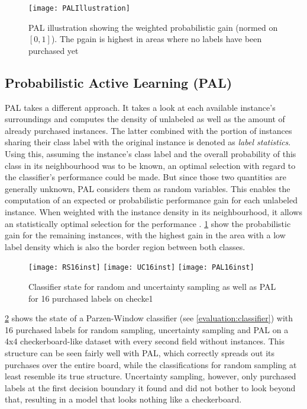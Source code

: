 \begin{figure}[h]
	\centering
	\texttt{[image: PALIllustration]}
	\caption{PAL illustration showing the weighted probabilistic gain (normed on $[0, 1]$). The pgain is highest in areas where no labels have been purchased yet}
	\label{fig:PALIllustration}
\end{figure}

\subsection{Probabilistic Active Learning (PAL)}
PAL takes a different approach. It takes a look at each available instance's surroundings and computes the density of unlabeled as well as the amount of already purchased instances. The latter combined with the portion of instances sharing their class label with the original instance is denoted as \textit{label statistics}. Using this, assuming the instance's class label and the overall probability of this class in its neighbourhood was to be known, an optimal selection with regard to the classifier's performance could be made. But since those two quantities are generally unknown, PAL considers them as random variables. This enables the computation of an expected or probabilistic performance gain for each unlabeled instance. When weighted with the instance density in its neighbourhood, it allows an statistically optimal selection for the performance \cite{KremplEtAl2014}. \ref{fig:PALIllustration} show the probabilistic gain for the remaining instances, with the highest gain in the area with a low label density which is also the border region between both classes.

\begin{figure}[h]
	\centering
	\texttt{[image: RS16inst]}
	\texttt{[image: UC16inst]}
	\texttt{[image: PAL16inst]}
	\caption{Classifier state for random and uncertainty sampling as well as PAL for 16 purchased labels on checke1}
	\label{fig:ALillustration}
\end{figure}

\ref{fig:ALillustration} shows the state of a Parzen-Window classifier (see \ref{evaluation:classifier}) with 16 purchased labels for random sampling, uncertainty sampling and PAL on a 4x4 checkerboard-like dataset with every second field without instances. This structure can be seen fairly well with PAL, which correctly spreads out its purchases over the entire board, while the classifications for random sampling at least resemble its true structure. Uncertainty sampling, however, only purchased labels at the first decision boundary it found and did not bother to look beyond that, resulting in a model that looks nothing like a checkerboard.

